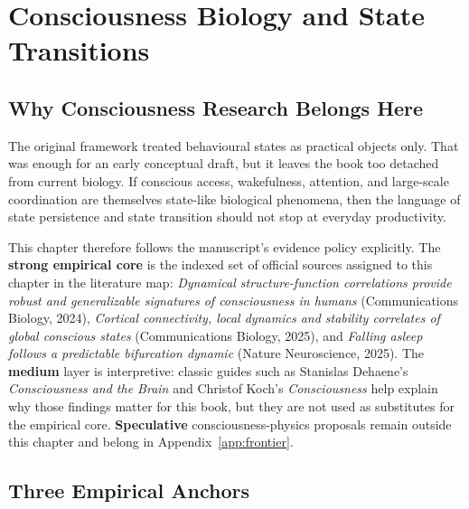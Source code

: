 \chapter{Consciousness Biology and State Transitions}
\label{ch:consciousness-biology}

\section{Why Consciousness Research Belongs Here}

The original framework treated behavioural states as practical objects only.
That was enough for an early conceptual draft, but it leaves the book too
detached from current biology. If conscious access, wakefulness, attention,
and large-scale coordination are themselves state-like biological phenomena,
then the language of state persistence and state transition should not stop at
everyday productivity.

This chapter therefore follows the manuscript's evidence policy explicitly. The
\textbf{strong empirical core} is the indexed set of official sources assigned
to this chapter in the literature map: \emph{Dynamical structure-function
correlations provide robust and generalizable signatures of consciousness in
humans} (Communications Biology, 2024),
\emph{Cortical connectivity, local dynamics and stability correlates of global
conscious states} (Communications Biology, 2025), and
\emph{Falling asleep follows a predictable bifurcation dynamic}
(Nature Neuroscience, 2025). The \textbf{medium} layer is interpretive:
classic guides such as Stanislas Dehaene's \emph{Consciousness and the Brain}
and Christof Koch's \emph{Consciousness} help explain why those findings
matter for this book, but they are not used as substitutes for the empirical
core. \textbf{Speculative} consciousness-physics proposals remain outside this
chapter and belong in Appendix~\ref{app:frontier}.

\section{Three Empirical Anchors}

